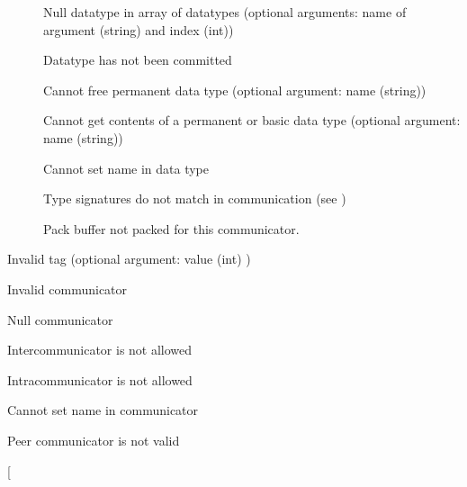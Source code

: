 \begin{description}
\begin{description}
    \item[
    ]Null datatype in array of 
      datatypes (optional arguments: name of argument (string) and index (int))
    \item[
    ]Datatype has not been 
      committed 
    \item[ ]Cannot
    free permanent data type 
      (optional argument: name (string))
    \item[
    ]Cannot get contents of a 
      permanent or basic data type (optional argument: name (string))
    \item[ ]Cannot set
    name in data type 
    \item[ ]Type
    signatures do not 
    match in communication (see \cite{gro:mpi-datatypes:pvmmpi00})
    \item[ ]Pack
    buffer not packed 
    for this communicator.  
    \end{description}
\item[\mpiconst{MPI_ERR_TAG} \emsg{tag}]Invalid tag (optional
    argument: value (int) ) 
\item[\mpiconst{MPI_ERR_COMM} \emsg{comm}]Invalid communicator
    \begin{description}
    \item[ ]Null communicator
    \item[
    ]Intercommunicator is not allowed 
    \item[
    ]Intracommunicator is not allowed 
    \item[ ]Cannot set
    name in communicator 
    \item[ ]Peer
    communicator is not valid 
    \item[

\end{description}
\end{description}
